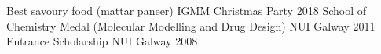 




\begin{cvhonors}


\cvhonor
{Best savoury food (mattar paneer)} %
{IGMM Christmas Party} %
{} %
{2018} %
\cvhonor
{School of Chemistry Medal (Molecular Modelling and Drug Design)} %
{NUI Galway} %
{} %
{2011} %
\cvhonor
{Entrance Scholarship} %
{NUI Galway} %
{} %
{2008} %

\end{cvhonors}


